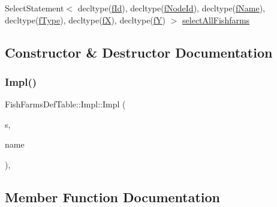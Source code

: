 \begin{DoxyCompactItemize}
\item 
Select\+Statement$<$ decltype(\mbox{\hyperlink{struct_fish_farms_def_table_1_1_impl_ae3eeaefb826965d54a6ebf27696a67c0}{f\+Id}}), decltype(\mbox{\hyperlink{struct_fish_farms_def_table_1_1_impl_acc9e1ce4f57803601bbf172bb6499207}{f\+Node\+Id}}), decltype(\mbox{\hyperlink{struct_fish_farms_def_table_1_1_impl_ad8cb7e9d96f8c73c705563c9c4537b1e}{f\+Name}}), decltype(\mbox{\hyperlink{struct_fish_farms_def_table_1_1_impl_a25df08564e817f991ab732f2e84af021}{f\+Type}}), decltype(\mbox{\hyperlink{struct_fish_farms_def_table_1_1_impl_a74ecffa210908377879c244444116dab}{fX}}), decltype(\mbox{\hyperlink{struct_fish_farms_def_table_1_1_impl_a7922671ffef246d44ed2c9fb4efd719d}{fY}}) $>$ \mbox{\hyperlink{struct_fish_farms_def_table_1_1_impl_aa544513374ceff01b8ce2ce1098b3f81}{select\+All\+Fishfarms}}
\end{DoxyCompactItemize}


\subsection{Constructor \& Destructor Documentation}
\mbox{\label{struct_fish_farms_def_table_1_1_impl_ae295ab3a54c48e5fcbd20b5d9190d575}} 
\subsubsection{\texorpdfstring{Impl()}{Impl()}}
{\footnotesize\ttfamily Fish\+Farms\+Def\+Table\+::\+Impl\+::\+Impl (\begin{DoxyParamCaption}\item[{std\+::shared\+\_\+ptr$<$ S\+Q\+Lite\+Storage $>$}]{s,  }\item[{std\+::string}]{name }\end{DoxyParamCaption})\hspace{0.3cm}{\ttfamily [inline]}, {\ttfamily [explicit]}}



\subsection{Member Function Documentation}
\mbox{\label{struct_fish_farms_def_table_1_1_impl_a36350085c8dac74cfb57dfe9dc7c03bf}} 
